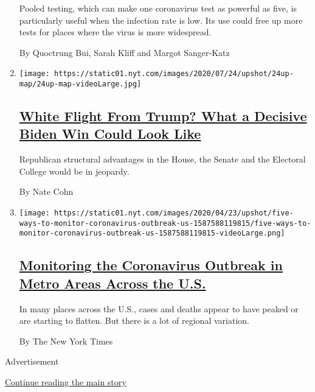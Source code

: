 \begin{enumerate}
  Pooled testing, which can make one coronavirus test as powerful as
  five, is particularly useful when the infection rate is low. Its use
  could free up more tests for places where the virus is more
  widespread.

  By Quoctrung Bui, Sarah Kliff and Margot Sanger-Katz
\item
  \texttt{[image: https://static01.nyt.com/images/2020/07/24/upshot/24up-map/24up-map-videoLarge.jpg]}

  \hypertarget{white-flight-from-trump-what-a-decisive-biden-win-could-look-like}{%
  \subsection{\texorpdfstring{\href{/2020/07/24/upshot/biden-polls-demographics.html}{White
  Flight From Trump? What a Decisive Biden Win Could Look
  Like}}{White Flight From Trump? What a Decisive Biden Win Could Look Like}}\label{white-flight-from-trump-what-a-decisive-biden-win-could-look-like}}

  Republican structural advantages in the House, the Senate and the
  Electoral College would be in jeopardy.

  By Nate Cohn
\item
  \texttt{[image: https://static01.nyt.com/images/2020/04/23/upshot/five-ways-to-monitor-coronavirus-outbreak-us-1587588119815/five-ways-to-monitor-coronavirus-outbreak-us-1587588119815-videoLarge.png]}

  \hypertarget{monitoring-the-coronavirus-outbreak-in-metro-areas-across-the-us}{%
  \subsection{\texorpdfstring{\href{/interactive/2020/04/23/upshot/five-ways-to-monitor-coronavirus-outbreak-us.html}{Monitoring
  the Coronavirus Outbreak in Metro Areas Across the
  U.S.}}{Monitoring the Coronavirus Outbreak in Metro Areas Across the U.S.}}\label{monitoring-the-coronavirus-outbreak-in-metro-areas-across-the-us}}

  In many places across the U.S., cases and deaths appear to have peaked
  or are starting to flatten. But there is a lot of regional variation.

  By The New York Times
\end{enumerate}

Advertisement

\protect\hyperlink{after-mid1}{Continue reading the main story}

